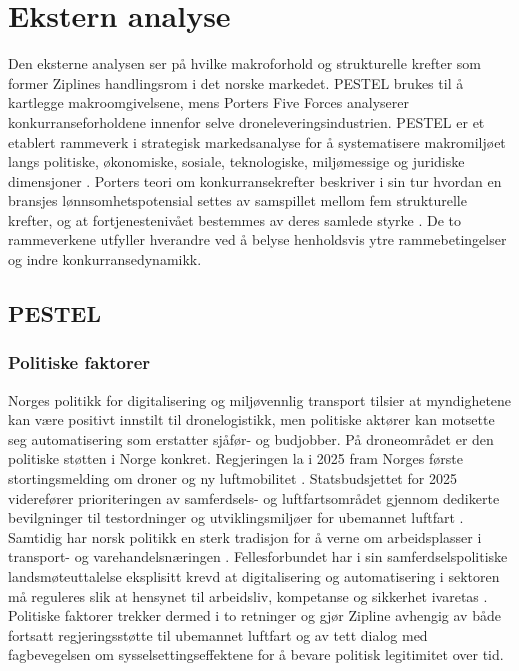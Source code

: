 \section{Ekstern analyse}
Den eksterne analysen ser på hvilke makroforhold og strukturelle
krefter som former Ziplines handlingsrom i det norske markedet. PESTEL brukes
til å kartlegge makroomgivelsene, mens Porters Five Forces analyserer
konkurranseforholdene innenfor selve droneleveringsindustrien. PESTEL er et
etablert rammeverk i strategisk markedsanalyse for å systematisere
makromiljøet langs politiske, økonomiske, sosiale, teknologiske,
miljømessige og juridiske dimensjoner \parencite{kotlerkellerchernev2022}.
Porters teori om konkurransekrefter beskriver i sin tur hvordan en bransjes
lønnsomhetspotensial settes av samspillet mellom fem strukturelle krefter,
og at fortjenestenivået bestemmes av deres samlede styrke
\parencite{porter1980}. De to rammeverkene utfyller hverandre ved å belyse
henholdsvis ytre rammebetingelser og indre konkurransedynamikk.

\subsection{PESTEL}

\subsubsection{Politiske faktorer}
Norges politikk for digitalisering og miljøvennlig transport tilsier at
myndighetene kan være positivt innstilt til dronelogistikk, men
politiske aktører kan motsette seg automatisering som erstatter sjåfør- og
budjobber. På droneområdet er den politiske støtten i Norge konkret.
Regjeringen la i 2025 fram Norges første stortingsmelding om droner og ny
luftmobilitet \parencite{stortingsmelding2025}. Statsbudsjettet for 2025
viderefører prioriteringen av samferdsels- og luftfartsområdet gjennom
dedikerte bevilgninger til testordninger og utviklingsmiljøer for ubemannet
luftfart \parencite{prop1s2024}. Samtidig har norsk politikk en sterk
tradisjon for å verne om
arbeidsplasser i transport- og varehandelsnæringen
\parencite{hurdalsplattformen2021}.
Fellesforbundet har i sin samferdselspolitiske landsmøteuttalelse eksplisitt
krevd at digitalisering og automatisering i sektoren må reguleres slik at
hensynet til arbeidsliv, kompetanse og sikkerhet ivaretas
\parencite{fellesforbundet2023_samferdsel}. Politiske faktorer trekker
dermed i to retninger og gjør Zipline avhengig av både fortsatt
regjeringsstøtte til ubemannet luftfart og av tett dialog med fagbevegelsen
om sysselsettingseffektene for å bevare politisk legitimitet over tid.

